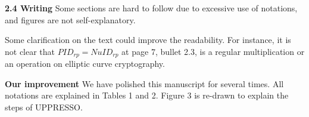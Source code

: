 \documentclass[letterpaper,onecolumn,10pt]{article}
\begin{document}
\vspace{1mm}\noindent\textbf{2.4 Writing}
Some sections are hard to follow due to excessive use of notations, and figures are not self-explanatory.

Some clarification on the text could improve the readability. For instance, it is not clear that $PID_{rp}= NuID_{rp}$ at page 7, bullet 2.3, is a regular multiplication or an operation on elliptic curve cryptography.

\vspace{1mm}\noindent\textbf{Our improvement}
We have polished this manuscript for several times.
All notations are explained in Tables 1 and 2.
Figure 3 is re-drawn to explain the steps of UPPRESSO.
\end{document}
